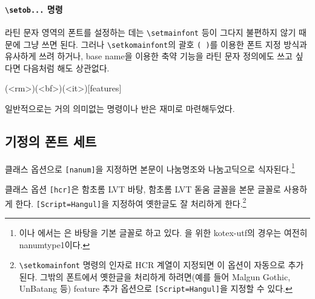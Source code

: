 \documentclass[
	12pt,
	a4paper,
	kosection,
	footnote,
	nobookmarks,
	microtype,
]{oblivoir}
\def\cs#1{\texttt{\textbackslash #1}}
\def\ct#1{\texttt{#1}}
\begin{document}
\paragraph{\cs{setob...} 명령}

라틴 문자 영역의 폰트를 설정하는 데는 \cs{setmainfont} 등이 그다지 불편하지 않기 때문에
그냥 쓰면 된다. 그러나 \cs{setkomainfont}의 괄호 \ct{( )}를 이용한 폰트 지정 방식과
유사하게 쓰려 하거나, base name을 이용한 축약 기능을 라틴 문자 정의에도 쓰고 싶다면 다음처럼 해도 상관없다.
\begin{boxedverbatim}
(<rm>)(<bf>)(<it>)[features]
\end{boxedverbatim}
일반적으로는 거의 의미없는 명령이나 반은 재미로 마련해두었다.

\subsection{기정의 폰트 세트}

클래스 옵션으로 \texttt{[nanum]}을 지정하면 본문이 나눔명조와 나눔고딕으로 식자된다.\footnote{%
\XeTeX 이나 \LuaTeX 에서는 은 바탕을 기본 글꼴로 하고 있다. 을 위한
kotex-utf의 경우는 여전히 nanumtype1이다.}

클래스 옵션 \texttt{[hcr]}은 함초롬 LVT 바탕, 함초롬 LVT 돋움 글꼴을 본문 글꼴로 사용하게 한다.
\texttt{[Script=Hangul]}을 지정하여 옛한글도 잘 처리하게 한다.\footnote{%
	\cs{setkomainfont} 명령의 인자로 HCR 계열이 지정되면 이 옵션이 자동으로 추가된다.
	그밖의 폰트에서 옛한글을 처리하게 하려면(예를 들어 Malgun Gothic, UnBatang 등)
	feature 추가 옵션으로 \texttt{[Script=Hangul]}을 지정할 수 있다.}
\end{document}
